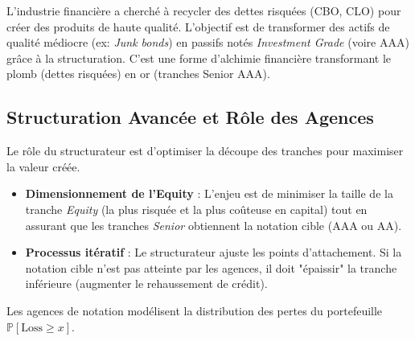 L'industrie financière a cherché à recycler des dettes risquées (CBO, CLO) pour créer des produits de haute qualité. L'objectif est de transformer des actifs de qualité médiocre (ex: \textit{Junk bonds}) en passifs notés \textit{Investment Grade} (voire AAA) grâce à la structuration. C'est une forme d'alchimie financière transformant le plomb (dettes risquées) en or (tranches Senior AAA).

\subsection{Structuration Avancée et Rôle des Agences}
Le rôle du structurateur est d'optimiser la découpe des tranches pour maximiser la valeur créée.
\begin{itemize}
    \item \textbf{Dimensionnement de l'Equity} : L'enjeu est de minimiser la taille de la tranche \textit{Equity} (la plus risquée et la plus coûteuse en capital) tout en assurant que les tranches \textit{Senior} obtiennent la notation cible (AAA ou AA).
    \item \textbf{Processus itératif} : Le structurateur ajuste les points d'attachement. Si la notation cible n'est pas atteinte par les agences, il doit "épaissir" la tranche inférieure (augmenter le rehaussement de crédit).
\end{itemize}

Les agences de notation modélisent la distribution des pertes du portefeuille $\mathbb{P}[\text{Loss} \ge x]$.

